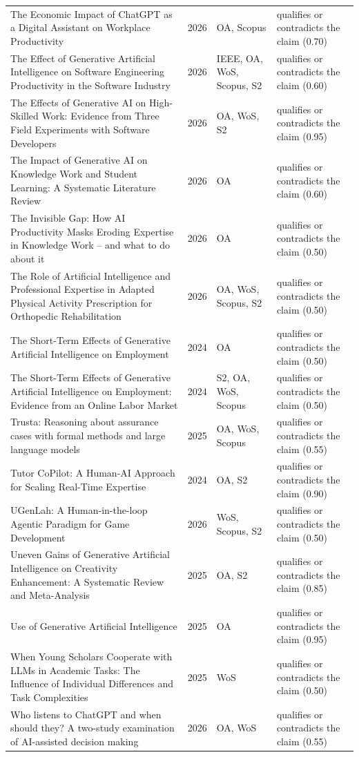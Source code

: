 \begin{longtable}{@{}%
  >{\raggedright\arraybackslash}p{}c%
  >{\raggedright\arraybackslash}p{}%
  >{\raggedright\arraybackslash}p{}@{}}
The Economic Impact of ChatGPT as a Digital Assistant on Workplace Productivity & 2026 & OA, Scopus & qualifies or contradicts the claim (0.70) \\
The Effect of Generative Artificial Intelligence on Software Engineering Productivity in the Software Industry & 2026 & IEEE, OA, WoS, Scopus, S2 & qualifies or contradicts the claim (0.60) \\
The Effects of Generative AI on High-Skilled Work: Evidence from Three Field Experiments with Software Developers & 2026 & OA, WoS, S2 & qualifies or contradicts the claim (0.95) \\
The Impact of Generative AI on Knowledge Work and Student Learning: A Systematic Literature Review & 2026 & OA & qualifies or contradicts the claim (0.60) \\
The Invisible Gap: How AI Productivity Masks Eroding Expertise in Knowledge Work -- and what to do about it & 2026 & OA & qualifies or contradicts the claim (0.50) \\
The Role of Artificial Intelligence and Professional Expertise in Adapted Physical Activity Prescription for Orthopedic Rehabilitation & 2026 & OA, WoS, Scopus, S2 & qualifies or contradicts the claim (0.50) \\
The Short-Term Effects of Generative Artificial Intelligence on Employment & 2024 & OA & qualifies or contradicts the claim (0.50) \\
The Short-Term Effects of Generative Artificial Intelligence on Employment: Evidence from an Online Labor Market & 2024 & S2, OA, WoS, Scopus & qualifies or contradicts the claim (0.50) \\
Trusta: Reasoning about assurance cases with formal methods and large language models & 2025 & OA, WoS, Scopus & qualifies or contradicts the claim (0.55) \\
Tutor CoPilot: A Human-AI Approach for Scaling Real-Time Expertise & 2024 & OA, S2 & qualifies or contradicts the claim (0.90) \\
UGenLah: A Human-in-the-loop Agentic Paradigm for Game Development & 2026 & WoS, Scopus, S2 & qualifies or contradicts the claim (0.50) \\
Uneven Gains of Generative Artificial Intelligence on Creativity Enhancement: A Systematic Review and Meta-Analysis & 2025 & OA, S2 & qualifies or contradicts the claim (0.85) \\
Use of Generative Artificial Intelligence & 2025 & OA & qualifies or contradicts the claim (0.95) \\
When Young Scholars Cooperate with LLMs in Academic Tasks: The Influence of Individual Differences and Task Complexities & 2025 & WoS & qualifies or contradicts the claim (0.50) \\
Who listens to ChatGPT and when should they? A two-study examination of AI-assisted decision making & 2026 & OA, WoS & qualifies or contradicts the claim (0.55) \\
\end{longtable}
\endgroup
